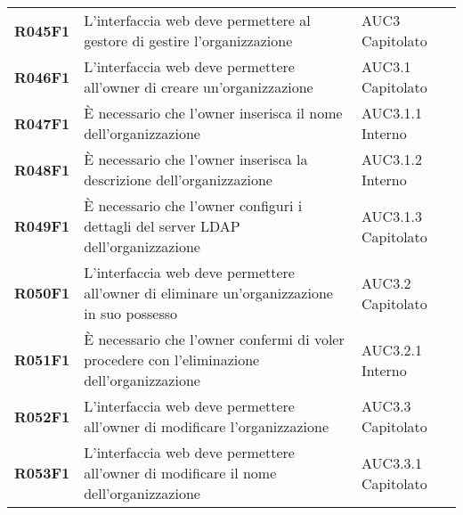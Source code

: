 \documentclass[../analisi-dei-requisiti.tex]{subfiles}
\begin{document}
\begin{center}
\begin{longtable}[H]{>{\centering\bfseries}m{3cm} >{\centering}m{10cm} >{\centering\arraybackslash}m{3cm}}
  R045F1                               & L'interfaccia web deve permettere al gestore di gestire l'organizzazione                                                                                                                                & AUC3 Capitolato               \\
  R046F1                               & L'interfaccia web deve permettere all'owner di creare un'organizzazione                                                                                                                                 & AUC3.1 Capitolato             \\
  R047F1                               & È necessario che l'owner inserisca il nome dell'organizzazione                                                                                                                                          & AUC3.1.1 Interno              \\
  R048F1                               & È necessario che l'owner inserisca la descrizione dell'organizzazione                                                                                                                                   & AUC3.1.2 Interno              \\
  R049F1                               & È necessario che l'owner configuri i dettagli del server LDAP dell'organizzazione                                                                                                                       & AUC3.1.3 Capitolato           \\
  R050F1                               & L'interfaccia web deve permettere all'owner di eliminare un'organizzazione in suo possesso                                                                                                              & AUC3.2 Capitolato             \\
  R051F1                               & È necessario che l'owner confermi di voler procedere con l'eliminazione dell'organizzazione                                                                                                             & AUC3.2.1 Interno              \\
  R052F1                               & L'interfaccia web deve permettere all'owner di modificare l'organizzazione                                                                                                                              & AUC3.3 Capitolato             \\
  R053F1                               & L'interfaccia web deve permettere all'owner di modificare il nome dell'organizzazione                                                                                                                   & AUC3.3.1 Capitolato           \\

\end{longtable}
\end{center}
\end{document}
